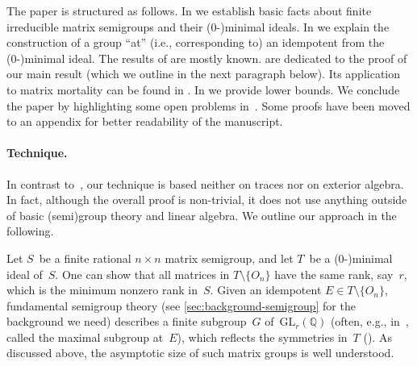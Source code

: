 \documentclass{lmcs}
\theoremstyle{definition}
\newcommand{\GL}{\mathrm{GL}}
\newcommand{\Q}{\mathbb{Q}}
\begin{document}
The paper is structured as follows. In  we establish basic facts about finite irreducible matrix semigroups and their (0-)minimal ideals. In  we explain the construction of a group ``at'' (i.e., corresponding to) an idempotent from the (0-)minimal ideal. The results of  are mostly known. %
 are dedicated to the proof of our main result (which we outline in the next paragraph below). Its application to matrix mortality can be found in . In  we provide lower bounds. We conclude the paper by highlighting some open problems in~. Some proofs have been moved to an appendix for better readability of the manuscript.



\paragraph*{Technique.}
In contrast to~\cite{Schutzenberger62,AlmeidaSteinberg09,BumpusHKST20}, our technique is based neither on traces nor on exterior algebra. In fact, although the overall proof is non-trivial, it does not use anything outside of basic (semi)group theory and linear algebra. %
We outline our approach in the following.

Let $S$~be a finite rational $n \times n$ matrix semigroup, and let $T$~be a (0-)minimal ideal of~$S$.
One can show that all matrices in $T \setminus \{O_n\}$ have the same rank, say~$r$, which is the minimum nonzero rank in~$S$.
Given an idempotent $E \in T \setminus \{O_n\}$, fundamental semigroup theory (see \cref{sec:background-semigroup} for the background we need) describes a finite subgroup~$G$ of~$\GL_r(\Q)$ (often, e.g., in~\cite{Almeida2009representation}, called the maximal subgroup at~$E$), which reflects the symmetries in~$T$ (). As discussed above, the asymptotic size of such matrix groups is well understood.
\end{document}
